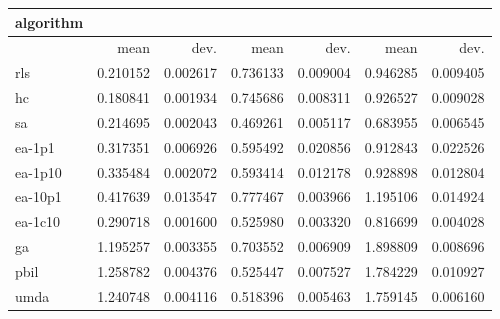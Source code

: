 \begin{tabular}{@{}l*{6}{>{{}}N{1}{2}}@{}}
\toprule
{algorithm} &  &  &  \\
\midrule
& {mean} & {dev.} & {mean} & {dev.} & {mean} & {dev.} \\
\midrule
rls & 0.210152 & 0.002617 & 0.736133 & 0.009004 & 0.946285 & 0.009405 \\
 hc & 0.180841 & 0.001934 & 0.745686 & 0.008311 & 0.926527 & 0.009028 \\
 sa & 0.214695 & 0.002043 & 0.469261 & 0.005117 & 0.683955 & 0.006545 \\
 ea-1p1 & 0.317351 & 0.006926 & 0.595492 & 0.020856 & 0.912843 & 0.022526 \\
 ea-1p10 & 0.335484 & 0.002072 & 0.593414 & 0.012178 & 0.928898 & 0.012804 \\
 ea-10p1 & 0.417639 & 0.013547 & 0.777467 & 0.003966 & 1.195106 & 0.014924 \\
 ea-1c10 & 0.290718 & 0.001600 & 0.525980 & 0.003320 & 0.816699 & 0.004028 \\
 ga & 1.195257 & 0.003355 & 0.703552 & 0.006909 & 1.898809 & 0.008696 \\
 pbil & 1.258782 & 0.004376 & 0.525447 & 0.007527 & 1.784229 & 0.010927 \\
 umda & 1.240748 & 0.004116 & 0.518396 & 0.005463 & 1.759145 & 0.006160 \\
 \bottomrule
\end{tabular}
